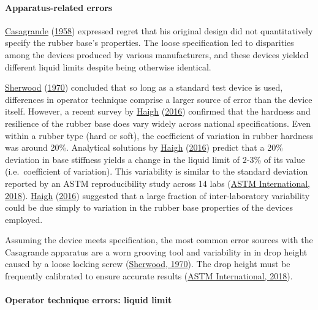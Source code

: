 \documentclass[
  letterpaper,
  openany]{book}
\begin{document}
\hypertarget{apparatus-related-errors}{%
\paragraph{Apparatus-related errors}\label{apparatus-related-errors}}

\protect\hyperlink{ref-Casagrande1958}{Casagrande} (\protect\hyperlink{ref-Casagrande1958}{1958}) expressed regret that his original design did not quantitatively specify the rubber base's properties.
The loose specification led to disparities among the devices produced by various manufacturers, and these devices yielded different liquid limits despite being otherwise identical.

\protect\hyperlink{ref-Sherwood1970}{Sherwood} (\protect\hyperlink{ref-Sherwood1970}{1970}) concluded that so long as a standard test device is used, differences in operator technique comprise a larger source of error than the device itself.
However, a recent survey by \protect\hyperlink{ref-Haigh2016}{Haigh} (\protect\hyperlink{ref-Haigh2016}{2016}) confirmed that the hardness and resilience of the rubber base does vary widely across national specifications.
Even within a rubber type (hard or soft), the coefficient of variation in rubber hardness was around 20\%.
Analytical solutions by \protect\hyperlink{ref-Haigh2016}{Haigh} (\protect\hyperlink{ref-Haigh2016}{2016}) predict that a 20\% deviation in base stiffness yields a change in the liquid limit of 2-3\% of its value (i.e.~coefficient of variation).
This variability is similar to the standard deviation reported by an ASTM reproducibility study across 14 labs (\protect\hyperlink{ref-ASTMD43182018}{ASTM International, 2018}). \protect\hyperlink{ref-Haigh2016}{Haigh} (\protect\hyperlink{ref-Haigh2016}{2016}) suggested that a large fraction of inter-laboratory variability could be due simply to variation in the rubber base properties of the devices employed.

Assuming the device meets specification, the most common error sources with the Casagrande apparatus are a worn grooving tool and variability in in drop height caused by a loose locking screw (\protect\hyperlink{ref-Sherwood1970}{Sherwood, 1970}).
The drop height must be frequently calibrated to ensure accurate results (\protect\hyperlink{ref-ASTMD43182018}{ASTM International, 2018}).

\hypertarget{operator-technique-errors-liquid-limit}{%
\paragraph{Operator technique errors: liquid limit}\label{operator-technique-errors-liquid-limit}}
\end{document}
